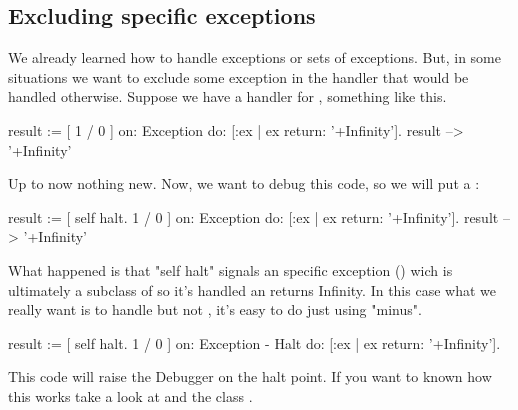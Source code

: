 
\subsection{Excluding specific exceptions}

We already learned how to handle exceptions or sets of exceptions. But, in some situations we want to exclude some exception in the handler that would be handled otherwise. Suppose we have a handler for , something like this.

\begin{code}{}
result := [ 1 / 0 ] 
	on: Exception
	do: [:ex | ex return: '+Infinity'].
result --> '+Infinity'
\end{code}

Up to now nothing new. Now, we want to debug this code, so we will put a :

\begin{code}{}
result := [ self halt.
			1 / 0 ] 
	on: Exception
	do: [:ex | ex return: '+Infinity'].
result --> '+Infinity'
\end{code}

What happened is that "self halt" signals an specific exception () wich is ultimately a subclass of  so it's handled an returns Infinity. In this case what we really want is to handle  but not , it's easy to do just using "minus".

\begin{code}{}
result := [ self halt.
			1 / 0 ] 
	on: Exception - Halt
	do: [:ex | ex return: '+Infinity'].
\end{code}

This code will raise the Debugger on the halt point. If you want to known how this works take a look at  and the class .

